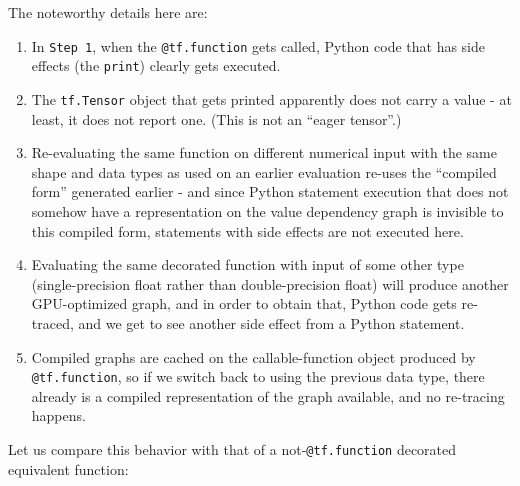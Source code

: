 \documentclass[11pt]{article}
\providecommand{\tightlist}{%
      \setlength{\itemsep}{0pt}\setlength{\parskip}{0pt}}
\begin{document}
    The noteworthy details here are:

\begin{enumerate}
\def\labelenumi{\arabic{enumi}.}
\tightlist
\item
  In \texttt{Step\ 1}, when the \texttt{@tf.function} gets called,
  Python code that has side effects (the \texttt{print}) clearly gets
  executed.
\item
  The \texttt{tf.Tensor} object that gets printed apparently does not
  carry a value - at least, it does not report one. (This is not an
  ``eager tensor''.)
\item
  Re-evaluating the same function on different numerical input with the
  same shape and data types as used on an earlier evaluation re-uses the
  ``compiled form'' generated earlier - and since Python statement
  execution that does not somehow have a representation on the value
  dependency graph is invisible to this compiled form, statements with
  side effects are not executed here.
\item
  Evaluating the same decorated function with input of some other type
  (single-precision float rather than double-precision float) will
  produce another GPU-optimized graph, and in order to obtain that,
  Python code gets re-traced, and we get to see another side effect from
  a Python statement.
\item
  Compiled graphs are cached on the callable-function object produced by
  \texttt{@tf.function}, so if we switch back to using the previous data
  type, there already is a compiled representation of the graph
  available, and no re-tracing happens.
\end{enumerate}

Let us compare this behavior with that of a not-\texttt{@tf.function}
decorated equivalent function:
\end{document}
